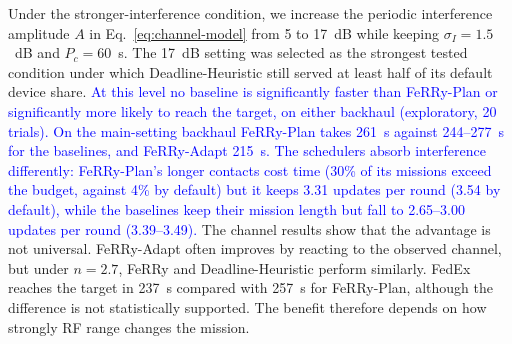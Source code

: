 \documentclass[conference]{IEEEtran}
\newcommand{\sysname}{FeRRy}
\begin{document}
Under the stronger-interference condition, we increase the periodic interference
amplitude \(A\) in Eq.~\eqref{eq:channel-model} from 5 to 17~dB while keeping
\(\sigma_I=1.5\)~dB and \(P_c=60\)~s. The 17~dB setting was selected as the
strongest tested condition under which Deadline-Heuristic still served at
least half of its default device share. \textcolor{blue}{At this level no
baseline is significantly faster than \sysname{}-Plan or significantly more likely
to reach the target, on either backhaul (exploratory, 20 trials). On the
main-setting backhaul \sysname{}-Plan takes 261~s against 244--277~s for the
baselines, and \sysname{}-Adapt 215~s. The schedulers absorb interference
differently: \sysname{}-Plan's longer contacts cost time (30\% of its missions
exceed the budget, against 4\% by default) but it keeps 3.31 updates per round
(3.54 by default), while the baselines keep their mission length but fall to
2.65--3.00 updates per round (3.39--3.49).} The channel results show that the
advantage is not universal. \sysname{}-Adapt often improves by reacting to the
observed channel, but under \(n=2.7\), \sysname{} and Deadline-Heuristic
perform similarly. FedEx reaches the target in 237~s compared with 257~s for
\sysname{}-Plan, although the difference is not statistically supported. The
benefit therefore depends on how strongly RF range changes the mission.
\end{document}
